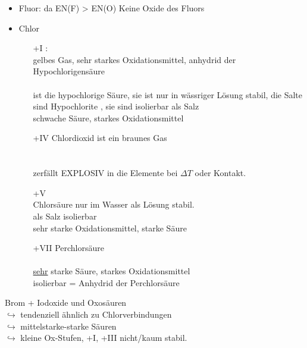 \documentclass{article}
\begin{document}
\begin{itemize}
    \item Fluor: da EN(F) > EN(O) Keine Oxide des Fluors
    \item Chlor
    \begin{itemize}
        \item[+I] : \\ gelbes Gas, sehr starkes Oxidationsmittel, anhydrid der Hypochlorigensäure\\\\ ist die hypochlorige Säure, sie ist nur in wässriger Lösung stabil, die Salte sind Hypochlorite , sie sind isolierbar als Salz\\schwache Säure, starkes Oxidationsmittel\\
        \item[+IV]  Chlordioxid ist ein braunes Gas\\ \\\\ zerfällt EXPLOSIV in die Elemente bei $\Delta T$ oder Kontakt.\\
        \item[+V] \\ Chlorsäure nur im Wasser als Lösung stabil.\\ \ce{[ClO3]^-} als Salz isolierbar\\ sehr starke Oxidationsmittel, starke Säure
        \item[+VII]  Perchlorsäure\\ \\\underline{sehr} starke Säure, starkes Oxidationsmittel\\ isolierbar  = Anhydrid der Perchlorsäure
    \end{itemize}
\end{itemize}
Brom + Iodoxide und Oxosäuren\\
$\hookrightarrow$ tendenziell ähnlich zu Chlorverbindungen\\
$\hookrightarrow$  mittelstarke-starke Säuren\\
$\hookrightarrow$  kleine Ox-Stufen, +I, +III nicht/kaum stabil.\\
\end{document}
